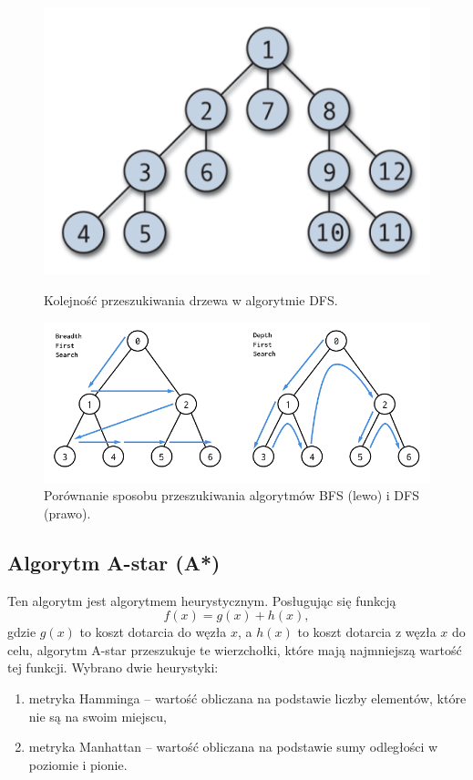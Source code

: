 \documentclass{classrep}
\begin{document}
    \begin{figure}[h]
        \centering
        \includegraphics[width=0.5\linewidth]{src/dfs}
        \caption{Kolejność przeszukiwania drzewa w algorytmie DFS. \cite{wikidfs}}
        \label{fig:dfs}
        \includegraphics[width=\linewidth]{src/bfs-vs-dfs}
        \caption{Porównanie sposobu przeszukiwania algorytmów BFS (lewo) i DFS (prawo).}
        \label{fig:bfs-vs-dfs}
    \end{figure}

    \subsection{Algorytm A-star (A*)}\label{subsec:algorytm-a-star}
    Ten algorytm jest algorytmem heurystycznym.
    Posługując się funkcją
    \begin{equation}
        f(x) = g(x) + h(x),\label{eq:a-star-fx}
    \end{equation}
    gdzie $g(x)$ to koszt dotarcia do węzła $x$, a $h(x)$ to koszt dotarcia z węzła $x$ do celu, algorytm A-star
    przeszukuje te wierzchołki, które mają najmniejszą wartość tej funkcji. \cite{jarabas}
    Wybrano dwie heurystyki:
    \begin{enumerate}
        \item metryka Hamminga -- wartość obliczana na podstawie liczby elementów, które nie są na swoim miejscu,
        \item metryka Manhattan -- wartość obliczana na podstawie sumy odległości w poziomie i pionie.
    \end{enumerate}
\end{document}
